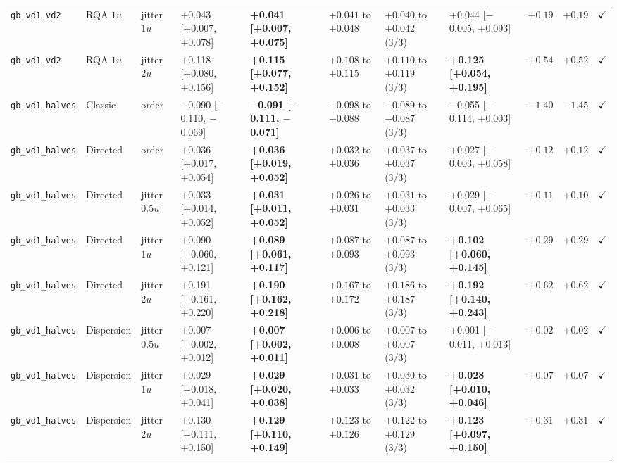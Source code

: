 \begin{longtable}{lllllllllrc}
\texttt{gb\_vd1\_vd2} & RQA $1u$ & jitter $1u$ & +0.043 [+0.007, +0.078] & \textbf{+0.041 [+0.007, +0.075]} & $+0.041$ to $+0.048$ & $+0.040$ to $+0.042$ (3/3) & +0.044 [$-$0.005, +0.093] & $+0.19$ & $+0.19$ & $\checkmark$ \\
\texttt{gb\_vd1\_vd2} & RQA $1u$ & jitter $2u$ & +0.118 [+0.080, +0.156] & \textbf{+0.115 [+0.077, +0.152]} & $+0.108$ to $+0.115$ & $+0.110$ to $+0.119$ (3/3) & \textbf{+0.125 [+0.054, +0.195]} & $+0.54$ & $+0.52$ & $\checkmark$ \\
\texttt{gb\_vd1\_halves} & Classic & order & $-$0.090 [$-$0.110, $-$0.069] & \textbf{$-$0.091 [$-$0.111, $-$0.071]} & $-0.098$ to $-0.088$ & $-0.089$ to $-0.087$ (3/3) & $-$0.055 [$-$0.114, +0.003] & $-1.40$ & $-1.45$ & $\checkmark$ \\
\texttt{gb\_vd1\_halves} & Directed & order & +0.036 [+0.017, +0.054] & \textbf{+0.036 [+0.019, +0.052]} & $+0.032$ to $+0.036$ & $+0.037$ to $+0.037$ (3/3) & +0.027 [$-$0.003, +0.058] & $+0.12$ & $+0.12$ & $\checkmark$ \\
\texttt{gb\_vd1\_halves} & Directed & jitter $0.5u$ & +0.033 [+0.014, +0.052] & \textbf{+0.031 [+0.011, +0.052]} & $+0.026$ to $+0.031$ & $+0.031$ to $+0.033$ (3/3) & +0.029 [$-$0.007, +0.065] & $+0.11$ & $+0.10$ & $\checkmark$ \\
\texttt{gb\_vd1\_halves} & Directed & jitter $1u$ & +0.090 [+0.060, +0.121] & \textbf{+0.089 [+0.061, +0.117]} & $+0.087$ to $+0.093$ & $+0.087$ to $+0.093$ (3/3) & \textbf{+0.102 [+0.060, +0.145]} & $+0.29$ & $+0.29$ & $\checkmark$ \\
\texttt{gb\_vd1\_halves} & Directed & jitter $2u$ & +0.191 [+0.161, +0.220] & \textbf{+0.190 [+0.162, +0.218]} & $+0.167$ to $+0.172$ & $+0.186$ to $+0.187$ (3/3) & \textbf{+0.192 [+0.140, +0.243]} & $+0.62$ & $+0.62$ & $\checkmark$ \\
\texttt{gb\_vd1\_halves} & Dispersion & jitter $0.5u$ & +0.007 [+0.002, +0.012] & \textbf{+0.007 [+0.002, +0.011]} & $+0.006$ to $+0.008$ & $+0.007$ to $+0.007$ (3/3) & +0.001 [$-$0.011, +0.013] & $+0.02$ & $+0.02$ & $\checkmark$ \\
\texttt{gb\_vd1\_halves} & Dispersion & jitter $1u$ & +0.029 [+0.018, +0.041] & \textbf{+0.029 [+0.020, +0.038]} & $+0.031$ to $+0.033$ & $+0.030$ to $+0.032$ (3/3) & \textbf{+0.028 [+0.010, +0.046]} & $+0.07$ & $+0.07$ & $\checkmark$ \\
\texttt{gb\_vd1\_halves} & Dispersion & jitter $2u$ & +0.130 [+0.111, +0.150] & \textbf{+0.129 [+0.110, +0.149]} & $+0.123$ to $+0.126$ & $+0.122$ to $+0.129$ (3/3) & \textbf{+0.123 [+0.097, +0.150]} & $+0.31$ & $+0.31$ & $\checkmark$ \\

\end{longtable}

